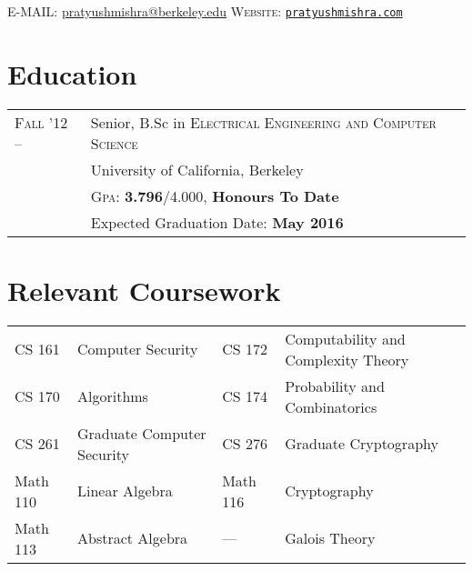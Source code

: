 \documentclass[10pt]{article}
\begin{document}
\pagestyle{empty} %

{\par}

\textsc{E-MAIL:} \href{mailto:pratyushmishra@berkeley.edu}{pratyushmishra@berkeley.edu}
\hfill
\textsc{Website:} \href{http://www.pratyushmishra.com}{\texttt{pratyushmishra.com}}

\section{Education}
\begin{tabular}{R{2.5cm}p{11cm}}

  \textsc{Fall '12 --} & Senior, B.Sc in \textsc{Electrical Engineering and Computer Science} \\
                       & University of California, Berkeley \\
                       & \textsc{Gpa:} \textbf{3.796}/4.000, \textbf{Honours To Date} \\
                       & Expected Graduation Date: \textbf{May 2016}\\
\end{tabular}

\section{Relevant Coursework}
\begin{tabular}{R{2.5cm}p{4.5cm}R{1.5cm}p{6cm}}

  CS 161   & Computer Security          & CS 172   & Computability and Complexity Theory\\
  CS 170   & Algorithms                 & CS 174   & Probability and Combinatorics\\
  CS 261   & Graduate Computer Security & CS 276   & Graduate Cryptography\\
  Math 110 & Linear Algebra             & Math 116 & Cryptography\\
  Math 113 & Abstract Algebra           & ---      & Galois Theory\\
\end{tabular}



\end{document}

